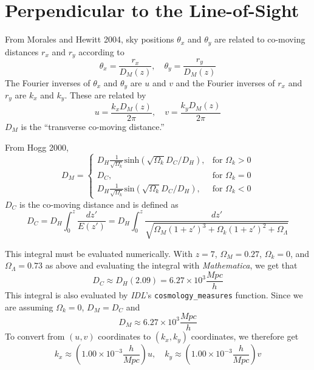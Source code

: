 \documentclass[a4paper,11pt]{article}
\begin{document}
\section{Perpendicular to the Line-of-Sight}

From Morales and Hewitt 2004, sky positions $\theta_x$ and $\theta_y$ are related to co-moving distances $r_x$ and $r_y$ according to
\begin{equation}
\theta_x = \frac{r_x}{D_M(z)}, \quad \theta_y = \frac{r_y}{D_M(z)}
\end{equation}
The Fourier inverses of $\theta_x$ and $\theta_y$ are $u$ and $v$ and the Fourier inverses of $r_x$ and $r_y$ are $k_x$ and $k_y$. These are related by
\begin{equation}
u = \frac{k_x D_M(z)}{2 \pi}, \quad v = \frac{k_y D_M(z)}{2 \pi}
\end{equation}
$D_M$ is the ``transverse co-moving distance.''

From Hogg 2000,
\begin{equation}
  D_M=\begin{cases}
    D_H \frac{1}{\sqrt{\Omega_k}} \text{sinh}(\sqrt{\Omega_k}D_C/D_H), & \text{for $\Omega_k>0$}\\
    D_C, & \text{for $\Omega_k=0$}\\
    D_H \frac{1}{\sqrt{\Omega_k}} \text{sin}(\sqrt{\Omega_k}D_C/D_H), & \text{for $\Omega_k<0$}
  \end{cases}
\end{equation}
$D_C$ is the co-moving distance and is defined as
\begin{equation}
D_C = D_H \int_0^z \frac{dz'}{E(z')} = D_H \int_0^z \frac{dz'}{\sqrt{\Omega_M(1+z')^3+\Omega_k(1+z')^2+\Omega_{\Lambda}}}
\end{equation}

This integral must be evaluated numerically. With $z=7$, $\Omega_M=0.27$, $\Omega_k=0$, and $\Omega_{\Lambda}=0.73$ as above and evaluating the integral with 
\textit{Mathematica}, we get that
\begin{equation}
D_C \approx D_H(2.09) = 6.27 \times 10^3 \frac{\si{Mpc}}{h}
\end{equation}
This integral is also evaluated by \textit{IDL}'s \texttt{cosmology\_measures} function. Since we are assuming $\Omega_k=0$, $D_M=D_C$ and
\begin{equation}
D_M \approx 6.27 \times 10^3 \frac{\si{Mpc}}{h}
\end{equation}
To convert from $(u, v)$ coordinates to $(k_x,k_y)$ coordinates, we therefore get
\begin{equation}
k_x \approx \left(1.00\times10^{-3} \frac{h}{\si{Mpc}}\right)u, \quad k_y \approx \left(1.00\times10^{-3} \frac{h}{\si{Mpc}}\right)v
\end{equation}
\end{document}
